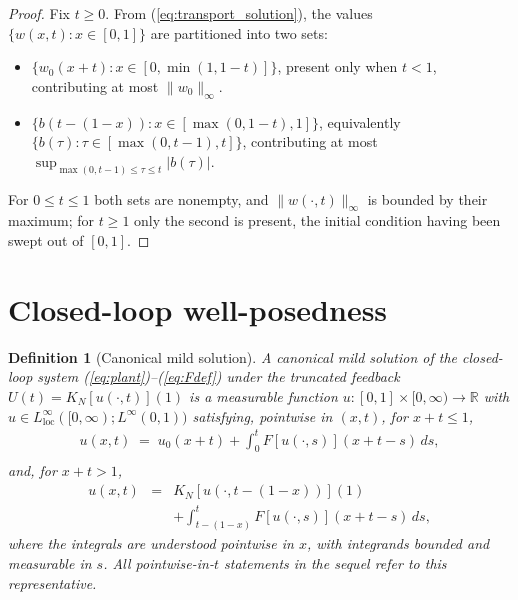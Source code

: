 \documentclass[10pt,a4paper]{amsart}
\newtheorem{definition}{Definition}
\newcommand{\R}{\mathbb{R}}
\newcommand{\Linf}{L^\infty}
\begin{document}
\begin{proof}
Fix $t \ge 0$. From (\ref{eq:transport_solution}), the values $\{w(x,t) : x \in [0,1]\}$ are partitioned into two sets:
\begin{itemize}
\item $\{w_0(x+t) : x \in [0, \min(1, 1-t)]\}$, present only when $t < 1$, contributing at most $\|w_0\|_\infty$.
\item $\{b(t - (1-x)) : x \in [\max(0, 1-t), 1]\}$, equivalently $\{b(\tau) : \tau \in [\max(0, t-1), t]\}$, contributing at most $\sup_{\max(0,t-1) \le \tau \le t} |b(\tau)|$.
\end{itemize}
For $0 \le t \le 1$ both sets are nonempty, and $\|w(\cdot,t)\|_\infty$ is bounded by their maximum; for $t \ge 1$ only the second is present, the initial condition having been swept out of $[0,1]$.
\end{proof}

\section{Closed-loop well-posedness}\label{sec:wellposed}

\begin{definition}[Canonical mild solution]\label{rem:canonical_rep}
A \emph{canonical mild solution} of the closed-loop system (\ref{eq:plant})--(\ref{eq:Fdef}) under the truncated feedback $U(t) = K_N[u(\cdot, t)](1)$ is a measurable function $u: [0,1] \times [0, \infty) \to \R$ with $u \in \Linf_{\mathrm{loc}}([0, \infty); \Linf(0,1))$ satisfying, pointwise in $(x, t)$, for $x + t \le 1$,
\begin{eqnarray}
u(x, t) \;=\; u_0(x + t) + \int_0^t F[u(\cdot, s)](x + t - s)\, ds, \nonumber \\
\label{eq:canonical_mild_a}
\end{eqnarray}
and, for $x + t > 1$,
\begin{eqnarray}
u(x, t) &=& K_N[u(\cdot, t - (1-x))](1) \nonumber \\
&& + \int_{t - (1-x)}^t F[u(\cdot, s)](x + t - s)\, ds,
\label{eq:canonical_mild_b}
\end{eqnarray}
where the integrals are understood pointwise in $x$, with integrands bounded and measurable in $s$. All pointwise-in-$t$ statements in the sequel refer to this representative.
\end{definition}
\end{document}
